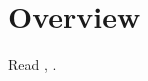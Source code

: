 \documentclass[a4paper,12pt]{article}
\begin{document}
\section*{Overview}
Read \cite{bour:tplgy}, \cite{nagata:tplgy}.
\end{document}
